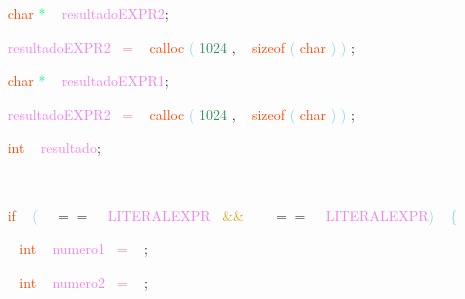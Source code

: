\documentclass[8, usernames, dvipsnames]{beamer}
\begin{document}
\begin{frame}
\textcolor{White}{\   }
\textcolor{OrangeRed}{char}
\textcolor{SpringGreen}{*}
\textcolor{White}{\ }
\textcolor{Violet}{resultadoEXPR2}\textcolor{Sepia}{;}

 \textcolor{White}{\   }
\textcolor{Violet}{resultadoEXPR2}\textcolor{White}{\ }
\textcolor{Salmon}{=}
\textcolor{White}{\ }
\textcolor{OrangeRed}{calloc}
\textcolor{SkyBlue}{(}
\textcolor{SeaGreen}{1024}
\textcolor{Sepia}{,}
\textcolor{White}{\ }
\textcolor{OrangeRed}{sizeof}
\textcolor{SkyBlue}{(}
\textcolor{OrangeRed}{char}
\textcolor{SkyBlue}{)}
\textcolor{SkyBlue}{)}
\textcolor{Sepia}{;}

 \textcolor{White}{\   }
\textcolor{OrangeRed}{char}
\textcolor{SpringGreen}{*}
\textcolor{White}{\ }
\textcolor{Violet}{resultadoEXPR1}\textcolor{Sepia}{;}

 \textcolor{White}{\   }
\textcolor{Violet}{resultadoEXPR2}\textcolor{White}{\ }
\textcolor{Salmon}{=}
\textcolor{White}{\ }
\textcolor{OrangeRed}{calloc}
\textcolor{SkyBlue}{(}
\textcolor{SeaGreen}{1024}
\textcolor{Sepia}{,}
\textcolor{White}{\ }
\textcolor{OrangeRed}{sizeof}
\textcolor{SkyBlue}{(}
\textcolor{OrangeRed}{char}
\textcolor{SkyBlue}{)}
\textcolor{SkyBlue}{)}
\textcolor{Sepia}{;}

 
 \textcolor{White}{\   }
\textcolor{OrangeRed}{int}
\textcolor{White}{\ }
\textcolor{Violet}{resultado}\textcolor{Sepia}{;}

 \textcolor{White}{\   }

 \textcolor{White}{\   }
\textcolor{OrangeRed}{if}
\textcolor{White}{\ }
\textcolor{SkyBlue}{(}
\textcolor{White}{\ }
\textcolor{OliveGreen}{$==$}
\textcolor{White}{\ }
\textcolor{Violet}{LITERALEXPR}\textcolor{White}{\ }
\textcolor{Goldenrod}{ \&\& }
\textcolor{White}{\ }
\textcolor{White}{\ }
\textcolor{OliveGreen}{$==$}
\textcolor{White}{\ }
\textcolor{Violet}{LITERALEXPR}\textcolor{SkyBlue}{)}
\textcolor{White}{\ }
\textcolor{SkyBlue}{\{ }

 \textcolor{White}{\   }
\textcolor{White}{\   }
\textcolor{OrangeRed}{int}
\textcolor{White}{\ }
\textcolor{Violet}{numero1}\textcolor{White}{\ }
\textcolor{Salmon}{=}
\textcolor{White}{\ }
\textcolor{Sepia}{;}

 \textcolor{White}{\   }
\textcolor{White}{\   }
\textcolor{OrangeRed}{int}
\textcolor{White}{\ }
\textcolor{Violet}{numero2}\textcolor{White}{\ }
\textcolor{Salmon}{=}
\textcolor{White}{\ }
\textcolor{Sepia}{;}

 \end{frame}
\end{document}
